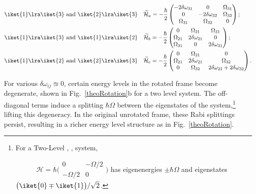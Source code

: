   \begin{equation}
  \begin{aligned}
	  \label{rwaHamitlonianApprox}
	  \iket{1}\lra\iket{3} \text{ and } \iket{2}\lra\iket{3} & \quad 
	  	\widetilde{\mathcal{H}}_{a} = -\frac{\hbar}{2}
	  	\begin{pmatrix}
	  		-2\delta\omega_{31} & 0 & \Omega_{31}\\  0 & -2\delta\omega_{32} & \Omega_{32} \\   	\Omega_{31} & \Omega_{32} & 0
	  	\end{pmatrix};\\
	  \iket{1}\lra\iket{3} \text{ and } \iket{1}\lra\iket{2} & \quad 
	  	\widetilde{\mathcal{H}}_{b} = -\frac{\hbar}{2}
	  	\begin{pmatrix}
	  		0 & \Omega_{21} & \Omega_{31}\\  \Omega_{21} & 2\delta\omega_{21} & 0 \\   	\Omega_{31} & 0 & 2\delta\omega_{31}
	  	\end{pmatrix};\\
	  	\iket{1}\lra\iket{2} \text{ and } \iket{2}\lra\iket{3} & \quad 
	  		\widetilde{\mathcal{H}}_{c} = -\frac{\hbar}{2}
	  		\begin{pmatrix}
	  		0 & \Omega_{21} & 0\\  \Omega_{21} & 2\delta\omega_{21} & \Omega_{32} \\   	
	  		0 & \Omega_{32} & 2\delta\omega_{21} + 2\delta\omega_{32}
	  	\end{pmatrix}.
  \end{aligned}
  \end{equation}
  
  \noindent For various $ \delta\omega_{ij} \approxeq 0$, certain energy levels in the rotated frame become degenerate, shown in Fig.~\ref{theoRotation}b for a two level system. The off-diagonal terms induce a splitting $ \hbar\Omega $ between the eigenstates of the system,\footnote{For a Two-Level , , system,
  	
  	$\qquad\quad \mathcal{H} = \hbar\big(\begin{smallmatrix}0 & -\Omega/2\\-\Omega/2&0\end{smallmatrix}\big) $ has eigenenergies $ \pm\hbar\Omega $ and eigenstates $ \big(\iket{0}\mp\iket{1}\big)/\sqrt{2} $.} lifting this degeneracy. In the original unrotated frame, these Rabi splittings persist, resulting in a richer energy level structure as in Fig.~\ref{theoRotation}.
  
